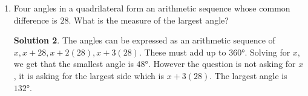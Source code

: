 \documentclass{article}
\theoremstyle{definition}
\newtheorem*{solution}{Solution}
\begin{document}
\begin{multicols}{2}
\begin{enumerate}
\begin{solution}
                The height of octagon ($AF$) is equal to $2 + 2\sqrt{2}$.
                Read the solution to problem 4 of 4.2 set B if you do not know how we derived this number.
                $FE = 2$.
                By the Pythagorean Theorem: $2^2 + (2 + 2\sqrt{2})^2 = (AE)^2$, so $8\sqrt{2} + 16 = (AE)^2$.
                $(AE)^2 = (AC)^2 + (CE)^2$, therefore $(AE)^2 = 2(AC)^2$.
                We are trying to find the area of the square $(AC)^2 = \frac{(AE)^2}{2} = \frac{8\sqrt{2} + 16}{2} = 4\sqrt2 + 8$ cm$^2$.
            \end{solution}
        \item Four angles in a quadrilateral form an arithmetic sequence whose common difference is $28$.
            What is the measure of the largest angle?
            \begin{solution}
                The angles can be expressed as an arithmetic sequence of $x, x + 28, x + 2(28), x + 3(28)$.
                These must add up to $\ang{360}$.
                Solving for $x$, we get that the smallest angle is $\ang{48}$.
                However the question is not asking for $x$, it is asking for the largest side which is $x + 3(28)$.
                The largest angle is $\ang{132}$.
            \end{solution}
    \end{enumerate}
\end{multicols}
\end{document}

